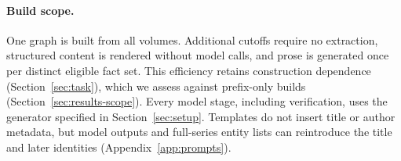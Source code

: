 \paragraph{Build scope.}
One graph is built from all volumes. Additional cutoffs require no extraction, structured
content is rendered without model calls, and prose is generated once per distinct eligible
fact set. This efficiency retains construction dependence (Section~\ref{sec:task}), which
we assess against prefix-only builds (Section~\ref{sec:results-scope}). Every model stage,
including verification, uses the generator specified in Section~\ref{sec:setup}. Templates
do not insert title or author metadata, but model outputs and full-series entity
lists can reintroduce the title and later identities (Appendix~\ref{app:prompts}).
